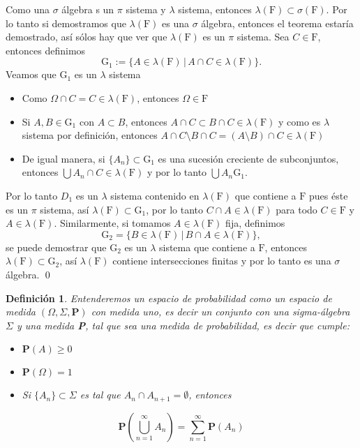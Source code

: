 \documentclass[letterpaper]{book}
\newtheorem{def.}{Definici\'on}[section]
\newcommand{\prob}{\textbf{P}}
\newcommand{\dem}{{\noindent \sc Demostraci\'on. }}
\newcommand{\om}{\ensuremath{\Omega}}
\begin{document}
\noindent\dem Como una \(\sigma\) álgebra s un \(\pi\) sistema y \(\lambda\) sistema, entonces \(\lambda(\mathrm{F})\subset\sigma(\mathrm{F})\). Por lo tanto si demostramos que \(\lambda(\mathrm{F})\) es una \(\sigma\) álgebra, entonces el teorema estaría demostrado, así sólos hay que ver que \(\lambda(\mathrm{F})\) es un \(\pi\) sistema. Sea \(C\in\mathrm{F}\), entonces definimos
\[
    \mathrm{G}_{1}:=\{A\in\lambda(\mathrm{F})\,\vert\,A\cap C\in\lambda(\mathrm{F})\}.
\]
\noindent Veamos que \(\mathrm{G}_1\) es un \(\lambda\) sistema
\begin{itemize}
\item Como \(\om\cap C=C\in\lambda(\mathrm{F})\), entonces \(\om\in\mathrm{F}\)
\item Si \(A,B\in\mathrm{G}_1\) con \(A\subset B\), entonces \(A\cap C\subset B\cap C\in\lambda(\mathrm{F})\) y como es \(\lambda\) sistema por definición, entonces \(A\cap C\setminus B\cap C=(A\setminus B)\cap C\in\lambda(\mathrm{F})\)
\item De igual manera, si  \(\{A_n\}\subset\mathrm{G}_1\) es una sucesión creciente de subconjuntos, entonces \(\bigcup A_n\cap C\in\lambda(\mathrm{F})\) y por lo tanto \(\bigcup A_n\mathrm{G}_1\).
\end{itemize}
Por lo tanto \(D_1\) es un \(\lambda\) sistema contenido en \(\lambda(\mathrm{F})\) que contiene a \(\mathrm{F}\) pues éste es un \(\pi\) sistema, así \(\lambda(\mathrm{F})\subset\mathrm{G}_1\), por lo tanto \(C\cap A\in\lambda(\mathrm{F})\) para todo \(C\in\mathrm{F}\) y \(A\in\lambda(\mathrm{F})\). Similarmente, si tomamos \(A\in\lambda(\mathrm{F})\) fija, definimos
\[
    \mathrm{G}_2=\{B\in\lambda(\mathrm{F})\,\vert\,B\cap A\in\lambda(\mathrm{F})\},
\]
\noindent se puede demostrar que \(\mathrm{G}_2\) es un \(\lambda\) sistema que contiene a \(\mathrm{F}\), entonces \(\lambda(\mathrm{F})\subset\mathrm{G}_2\), así \(\lambda(\mathrm{F})\) contiene intersecciones finitas y por lo tanto es una \(\sigma\) álgebra.
\qed\\

\begin{def.}
\noindent Entenderemos un \emph{espacio de probabilidad} como un espacio de medida \((\Omega,\Sigma,\prob)\) con medida uno, es decir un conjunto con una \emph{sigma-álgebra} \(\Sigma\) y una medida \textbf{P}, tal que sea una medida de probabilidad, es decir que cumple:

\begin{itemize}
\item \(\prob(A)\geq 0\)
\item \(\prob(\Omega)=1\)
\item Si \(\{A_n\}\subset\Sigma\) es tal que \(A_n\cap A_{n+1}=\emptyset\), entonces
\end{itemize}
\[
\prob(\bigcup_{n=1}^{\infty} A_n)=\sum_{n=1}^{\infty} \prob(A_n)
\]
\end{def.}
\end{document}
